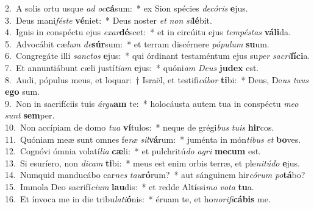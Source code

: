 {2.~}A solis ortu usque \textit{ad} \textit{oc}\textbf{cá}sum:~* ex Sion spécies \textit{de}\textit{có}\textit{ris} \textbf{e}jus.\\
{3.~}Deus mani\textit{fé}\textit{ste} \textbf{vé}niet:~* Deus noster \textit{et} \textit{non} \textit{si}\textbf{lé}bit.\\
{4.~}Ignis in conspéctu ejus \textit{e}\textit{xar}\textbf{dé}scet:~* et in circúitu ejus \textit{tem}\textit{pé}\textit{stas} \textbf{vá}\textbf{li}da.\\
{5.~}Advocábit cæ\textit{lum} \textit{de}\textbf{súr}sum:~* et terram discérnere \textit{pó}\textit{pu}\textit{lum} \textbf{su}um.\\
{6.~}Congregáte illi \textit{san}\textit{ctos} \textbf{e}jus:~* qui órdinant testaméntum ejus su\textit{per} \textit{sa}\textit{cri}\textbf{fí}\textbf{ci}a.\\
{7.~}Et annuntiábunt cæli justí\textit{ti}\textit{am} \textbf{e}jus:~* quóni\textit{am} \textit{De}\textit{us} \textbf{ju}\textbf{dex} est.\\
{8.~}Audi, pópulus meus, et loquar:~† Israël, et testifi\textit{cá}\textit{bor} \textbf{ti}bi:~* Deus, De\textit{us} \textit{tu}\textit{us} \textbf{e}\textbf{go} sum.\\
{9.~}Non in sacrifíciis tuis \textit{ár}\textit{gu}\textbf{am} te:~* holocáusta autem tua in conspéctu \textit{me}\textit{o} \textit{sunt} \textbf{sem}per.\\
{10.~}Non accípiam de domo \textit{tu}\textit{a} \textbf{ví}tulos:~* neque de grégi\textit{bus} \textit{tu}\textit{is} \textbf{hir}cos.\\
{11.~}Quóniam meæ sunt omnes fe\textit{ræ} \textit{sil}\textbf{vá}rum:~* juménta in món\textit{ti}\textit{bus} \textit{et} \textbf{bo}ves.\\
{12.~}Cognóvi ómnia volatí\textit{li}\textit{a} \textbf{cæ}li:~* et pulchritú\textit{do} \textit{a}\textit{gri} \textbf{me}\textbf{cum} est.\\
{13.~}Si esuríero, non \textit{di}\textit{cam} \textbf{ti}bi:~* meus est enim orbis terræ, et ple\textit{ni}\textit{tú}\textit{do} \textbf{e}jus.\\
{14.~}Numquid manducábo car\textit{nes} \textit{tau}\textbf{ró}rum?~* aut sánguinem hir\textit{có}\textit{rum} \textit{po}\textbf{tá}bo?\\
{15.~}Immola Deo sacrifí\textit{ci}\textit{um} \textbf{lau}dis:~* et redde Altíssi\textit{mo} \textit{vo}\textit{ta} \textbf{tu}a.\\
{16.~}Et ínvoca me in die tribu\textit{la}\textit{ti}\textbf{ó}nis:~* éruam te, et ho\textit{no}\textit{ri}\textit{fi}\textbf{cá}\textbf{bis} me.\\

